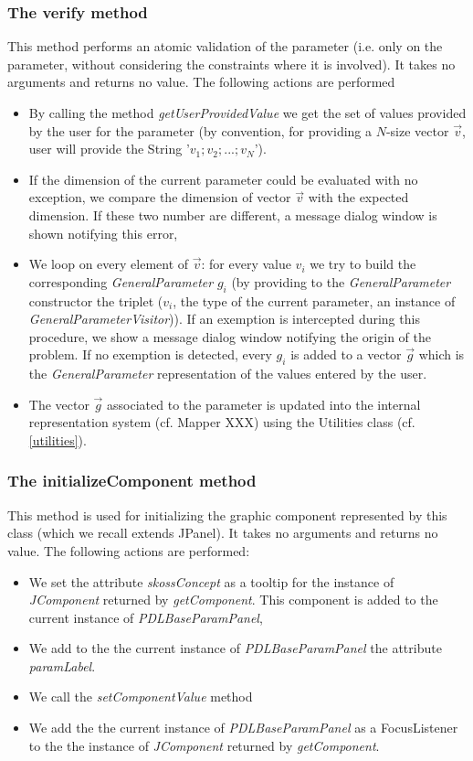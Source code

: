 \documentclass[a4paper,11pt] {ivoa}
\begin{document}
\subsubsection{The verify method}
This method performs an atomic validation of the parameter (i.e. only on the parameter, without considering the constraints where it is involved). It takes no arguments and returns no value. The following actions are performed
\begin{itemize}
\item By calling the method {\it getUserProvidedValue} we get the set of values provided by the user for the parameter (by convention, for providing a $N$-size vector $\vec v$, user will provide the String '$v_1; v_2;...;v_N$'). \item If the dimension of the current parameter could be evaluated with no exception, we compare the dimension of vector $\vec v$ with the expected dimension.  If these two number are different, a message dialog window is shown notifying this error,
\item We loop on every element of $\vec v$: for every value $v_i$ we try to build the corresponding {\it GeneralParameter} $g_i$ (by providing to the {\it GeneralParameter} constructor the triplet ($v_i$, the type of the current parameter, an instance of {\it GeneralParameterVisitor})). If an exemption is intercepted during this procedure, we show a message dialog window notifying the origin of the problem. If no exemption is detected, every $g_i$ is added to a vector $\vec g$ which is the {\it GeneralParameter} representation of the values entered by the user. 
\item The vector $\vec g$ associated to the parameter is updated into the internal representation system (cf. Mapper XXX) using the Utilities class (cf. \ref{utilities}). 
\end{itemize}

\subsubsection{The initializeComponent method}
This method is used for initializing the graphic component represented by this class (which we recall extends JPanel). It takes no arguments and returns no value.
The following actions are performed:
\begin{itemize}
\item We set the attribute {\it skossConcept} as a tooltip for the instance of {\it JComponent} returned by {\it getComponent}. This component is added to the current instance of {\it PDLBaseParamPanel},
\item We add to the the current instance of {\it PDLBaseParamPanel} the attribute {\it paramLabel}.
\item We call the {\it setComponentValue} method
\item We add the the current instance of {\it PDLBaseParamPanel} as a FocusListener to the the instance of {\it JComponent} returned by {\it getComponent}.
\end{itemize}
\end{document}
